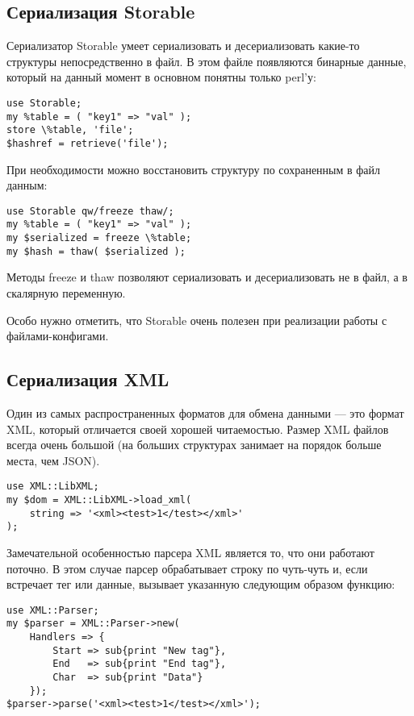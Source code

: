 \subsection{Сериализация Storable}
Сериализатор Storable умеет сериализовать и десериализовать какие-то структуры непосредственно в файл. В этом файле появляются бинарные данные, который на данный момент в основном понятны только perl'у:
\begin{verbatim}
use Storable;
my %table = ( "key1" => "val" );
store \%table, 'file';
$hashref = retrieve('file');
\end{verbatim}
При необходимости можно восстановить структуру по сохраненным в файл данным:
\begin{verbatim}
use Storable qw/freeze thaw/;
my %table = ( "key1" => "val" );
my $serialized = freeze \%table;
my $hash = thaw( $serialized );
\end{verbatim}
Методы freeze и thaw позволяют сериализовать и десериализовать не в файл, а в скалярную переменную.

Особо нужно отметить, что Storable очень полезен при реализации работы с файлами-конфигами.

\subsection{Сериализация XML}
Один из самых распространенных форматов для обмена данными --- это формат XML, который отличается своей хорошей читаемостью. Размер XML файлов всегда очень большой (на больших структурах занимает на порядок больше места, чем JSON).
\begin{verbatim}
use XML::LibXML;
my $dom = XML::LibXML->load_xml(
    string => '<xml><test>1</test></xml>'
);
\end{verbatim}

Замечательной особенностью парсера XML является то, что они работают поточно.
В этом случае парсер обрабатывает строку по чуть-чуть и, если встречает тег или данные, вызывает указанную следующим образом функцию:
\begin{verbatim}
use XML::Parser;
my $parser = XML::Parser->new(
    Handlers => {
        Start => sub{print "New tag"},
        End   => sub{print "End tag"},
        Char  => sub{print "Data"}
    });
$parser->parse('<xml><test>1</test></xml>');
\end{verbatim}

